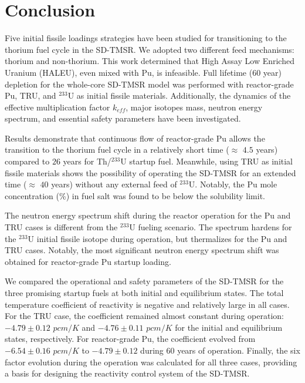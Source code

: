 \section{Conclusion} \label{Conclusion}
Five initial fissile loadings strategies have been studied for 
transitioning to the thorium fuel cycle in the SD-TMSR. We 
adopted two different feed mechanisms: thorium and non-thorium. 
This work determined that High Assay Low Enriched Uranium (HALEU), even mixed with Pu, is infeasible. 
Full lifetime (60 year) depletion for the whole-core SD-TMSR model was 
performed with reactor-grade Pu, TRU, and $^{233}$U as initial fissile 
materials. Additionally, the dynamics of the effective multiplication factor 
$k_{eff}$, major isotopes mass, neutron energy spectrum, and essential safety 
parameters have been investigated. 

Results demonstrate that continuous flow of reactor-grade Pu allows the 
transition to the thorium fuel cycle in a relatively short time ($\approx$ 
$4.5$ years) compared to $26$ years for Th/$^{233}$U startup fuel. 
Meanwhile, using \gls{TRU} as initial fissile materials shows the possibility 
of operating the SD-TMSR for an extended time ($\approx$ $40$ years) 
without any external feed of $^{233}$U. Notably, the Pu mole concentration (\%) in 
fuel salt was found to be below the solubility limit. 

The neutron energy spectrum shift during the reactor operation 
for the Pu and TRU cases is different from the $^{233}$U fueling scenario. 
The spectrum hardens for the $^{233}$U initial fissile isotope during 
operation, but thermalizes for the Pu and TRU cases. Notably, the most 
significant neutron energy spectrum shift was obtained for reactor-grade Pu 
startup loading. 

We compared the operational and safety parameters of the \gls{SD-TMSR} for the 
three promising startup fuels at both initial and equilibrium states. The total 
temperature coefficient of reactivity is negative and relatively large in all 
cases. For the TRU case, the coefficient remained almost constant during 
operation: $-4.79\pm0.12$ $pcm/K$ and $-4.76\pm0.11$ $pcm/K$ for the initial 
and equilibrium states, respectively. For reactor-grade Pu, the coefficient 
evolved from $-6.54\pm0.16$ $pcm/K$ to $-4.79\pm0.12$ during 
60 years of operation. Finally, the six factor evolution during the operation 
was calculated for all three cases, providing a basis for designing the reactivity control system of the \gls{SD-TMSR}.

